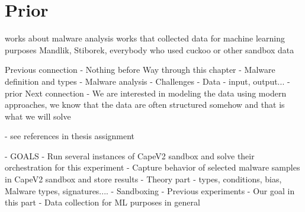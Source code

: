 \section{Prior}
works about malware analysis
works that collected data for machine learning purposes
Mandlik, Stiborek, everybody who used cuckoo or other sandbox data





Previous connection
- Nothing before
Way through this chapter
- Malware definition and types
- Malware analysis
- Challenges
- Data - input, output...
- prior
Next connection
- We are interested in modeling the data using modern approaches, we know that the data are often structured somehow and that is what we will solve





- see references in thesis assignment


- GOALS
  - Run several instances of CapeV2 sandbox and solve their orchestration for this experiment
  - Capture behavior of selected malware samples in CapeV2 sandbox and store results
- Theory part - types, conditions, bias, Malware types, signatures....
- Sandboxing
- Previous experiments
- Our goal in this part
- Data collection for ML purposes in general